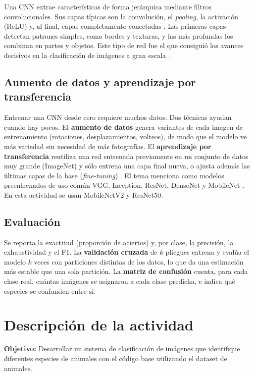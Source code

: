 \documentclass[11pt,letterpaper]{article}
\begin{document}
Una CNN extrae características de forma jerárquica mediante filtros convolucionales. Sus capas típicas son la convolución, el \textit{pooling}, la activación (ReLU) y, al final, capas completamente conectadas \parencite{iae_u4_t42}. Las primeras capas detectan patrones simples, como bordes y texturas, y las más profundas los combinan en partes y objetos. Este tipo de red fue el que consiguió los avances decisivos en la clasificación de imágenes a gran escala \parencite{krizhevsky2012}.

\subsection{Aumento de datos y aprendizaje por transferencia}

Entrenar una CNN desde cero requiere muchos datos. Dos técnicas ayudan cuando hay pocos. El \textbf{aumento de datos} genera variantes de cada imagen de entrenamiento (rotaciones, desplazamientos, volteos), de modo que el modelo ve más variedad sin necesidad de más fotografías. El \textbf{aprendizaje por transferencia} reutiliza una red entrenada previamente en un conjunto de datos muy grande (ImageNet) y sólo entrena una capa final nueva, o ajusta además las últimas capas de la base (\textit{fine-tuning}) \parencite{iae_u4_t42, elgendy2020, lakshmanan2021}. El tema menciona como modelos preentrenados de uso común VGG, Inception, ResNet, DenseNet y MobileNet \parencite{iae_u4_t42}. En esta actividad se usan MobileNetV2 y ResNet50.

\subsection{Evaluación}

Se reporta la exactitud (proporción de aciertos) y, por clase, la precisión, la exhaustividad y el F1. La \textbf{validación cruzada} de $k$ pliegues entrena y evalúa el modelo $k$ veces con particiones distintas de los datos, lo que da una estimación más estable que una sola partición. La \textbf{matriz de confusión} cuenta, para cada clase real, cuántas imágenes se asignaron a cada clase predicha, e indica qué especies se confunden entre sí.

\section{Descripción de la actividad}

\textbf{Objetivo:} Desarrollar un sistema de clasificación de imágenes que identifique diferentes especies de animales con el código base utilizando el dataset de animales.
\end{document}
